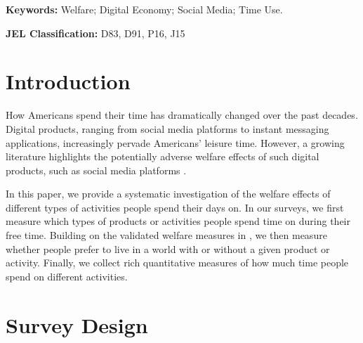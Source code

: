 \documentclass[11pt]{article}
\begin{document}
\bigskip

\noindent \textbf{Keywords:} Welfare; Digital Economy; Social Media; Time Use.\\\bigskip

\noindent \textbf{JEL Classification:} D83, D91, P16, J15

\bigskip \bigskip \bigskip \newpage

\pagebreak


\setcounter{page}{1}
\begin{spacing}{1.2}

\section{Introduction}\label{sec:introduction}

How Americans spend their time has dramatically changed over the past decades. Digital products, ranging from social media platforms to instant messaging applications, increasingly pervade Americans' leisure time. However, a growing literature highlights the potentially adverse welfare effects of such digital products, such as social media platforms \citep{bursztyn2023trap,allcott2022digital,braghieri2022social}.

In this paper, we provide a systematic investigation of the welfare effects of different types of activities people spend their days on. 
In our surveys, we first measure which types of products or activities people spend time on during their free time. Building on the validated welfare measures in \cite{bursztyn2023trap}, we then measure whether people prefer to live in a world with or without a given product or activity. Finally, we collect rich quantitative measures of how much time people spend on different activities. 

\section{Survey Design}



\end{spacing}

\clearpage
\begin{spacing}{1}

\normalsize 
\end{spacing}
\end{document}
